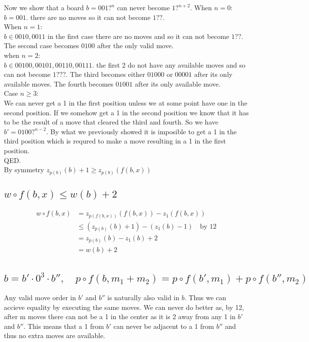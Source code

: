 \documentclass{article}
\begin{document}
\vspace{\baselineskip}
\noindent
Now we show that a board $b = 001?^{n}$ can never become $1?^{n+2}$.  
When $n=0$:\\
$b = 001$. there are no moves so it can not become $1??$. \\
When $n=1$: \\
$b \in {0010, 0011}$ in the first case there are no moves and so it can not become $1??$. The second case becomes $0100$ after the only valid move.\\
when $n=2$: \\
$b \in {00100, 00101, 00110, 00111}$. the first 2 do not have any available moves and so can not become $1???$. The third becomes either $01000$ or $00001$ after its only available moves. The fourth becomes $01001$ after its only available move. \\
Case $n\ge 3$: \\
We can never get a 1 in the first position unless we at some point have one in the second position.
If we somehow get a 1 in the second position we know that it has to be the result of a move that cleared the third and fourth. 
So we have $b' = 0100?^{n-2}$. By what we previously showed it is imposible to get a 1 in the third position which is requred to make a move resulting in a 1 in the first position. \\
QED.\\
By symmetry $z_{p(b)}(b)+1\ge z_{p(b)}(f(b,x))$

\subsection{$w\circ f(b,x)\le w(b)+2$}
\begin{equation*}
\begin{split}
    w\circ f(b,x)&= z_{p(f(b,x))}(f(b,x))-z_{1}(f(b,x))\\
    &\le (z_{p(b)}(b)+1)-(z_{1}(b)-1)\quad \text{by 12}\\ 
    &= z_{p(b)}(b)-z_{1}(b)+2 \\
    &= w(b)+2\\
\end{split}
\end{equation*}

\subsection{$b = b'\cdot 0^3\cdot b'',\quad p\circ f(b,m_1+m_2) = p\circ f(b',m_1) + p\circ f(b'',m_2)$} 
Any valid move order in $b'$ and $b''$ is naturally also valid in $b$. 
Thus we can accieve equality by executing the same moves. 
We can never do better as, by 12, after m moves there can not be a 1 in the center as it is 2 away from any 1 in $b'$ and $b''$. This means that a 1 from $b'$ can never be adjacent to a 1 from $b''$ and thus no extra moves are available. 
\end{document}
